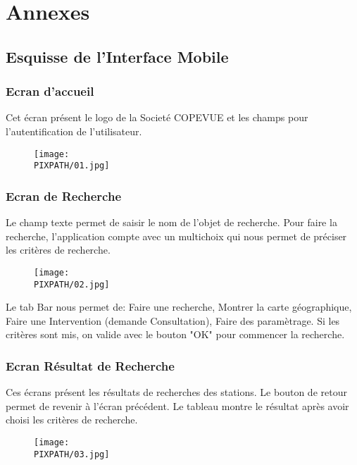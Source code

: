 \vfill
\pagebreak
\section{Annexes}

\subsection{Esquisse de l'Interface Mobile}

\subsubsection{Ecran d'accueil}
Cet écran présent le logo de la Societé COPEVUE et les champs pour l'autentification
de l'utilisateur.

\begin{figure}[!h] 
\begin{center}
\texttt{[image: \\PIXPATH/01.jpg]} 
\end{center} 
\end{figure} 
\vfil
\pagebreak
\subsubsection{Ecran de Recherche}
Le champ texte permet de saisir le nom de l'objet de recherche.
Pour faire la recherche, l'application compte avec un multichoix qui nous permet de préciser les critères de recherche.

\begin{figure}[!h]
\begin{center}
\texttt{[image: \\PIXPATH/02.jpg]}
\end{center} 
\end{figure} 

Le tab Bar nous permet de: Faire une recherche, Montrer la carte géographique, Faire une Intervention (demande Consultation), Faire des paramètrage. 
Si les critères sont mis, on valide avec le bouton "OK" pour commencer la recherche.

\vfil
\pagebreak
\subsubsection{Ecran Résultat de Recherche}
Ces écrans présent les résultats de recherches des stations.
Le bouton de retour permet de revenir à l'écran précédent.
Le tableau montre le résultat après avoir choisi les critères de recherche.

\begin{figure}[!h] 
\begin{center}
\texttt{[image: \\PIXPATH/03.jpg]} 
\end{center}
\end{figure} 

